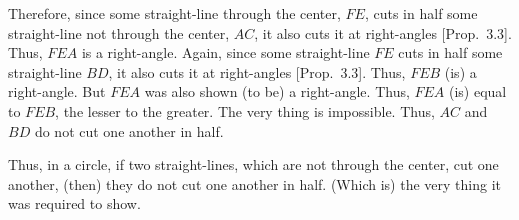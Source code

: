 \begin{Parallel}{}{}
{Therefore, since some straight-line through the center, $FE$, cuts in half
some straight-line not through the center, $AC$, it also cuts it at right-angles
[Prop.~3.3]. Thus, $FEA$ is a right-angle. Again, since some straight-line
$FE$ cuts in half some straight-line $BD$, it also cuts it at right-angles [Prop.~3.3]. Thus, $FEB$ (is) a right-angle. But $FEA$ was also shown (to be) a right-angle. Thus, $FEA$ (is) equal to $FEB$, the lesser to the greater.
The very thing is impossible. Thus, $AC$ and $BD$ do not cut one another in half.

Thus, in a circle, if two straight-lines, which are not through the center, cut
one another, (then) they do not cut one another in half. (Which is) the very
thing it was required to show.}
\end{Parallel}

